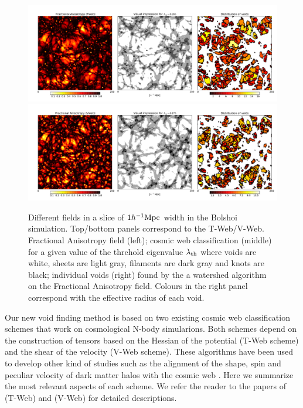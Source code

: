 \documentclass[a4,useAMS,usenatbib,usegraphicx]{mn2e}
\newcommand{\hMpc}{{\ifmmode{h^{-1}{\rm Mpc}}\else{$h^{-1}$Mpc}\fi}}
\begin{document}
\begin{figure}
  \includegraphics[trim = 16mm 8mm 5mm 12mm, clip, keepaspectratio=true,
  width=0.73\textheight]{cosmicweb_FA_Tweb.pdf}
  \includegraphics[trim = 16mm 8mm 5mm 12mm, clip, keepaspectratio=true,
  width=0.73\textheight]{cosmicweb_FA_Vweb.pdf}
  \caption{Different fields in a slice of
    $1\hMpc$ width in the Bolshoi simulation. Top/bottom panels correspond
    to the T-Web/V-Web.      
    Fractional Anisotropy field (left); cosmic web classification
    (middle) for a given value of the threhold eigenvalue
    $\lambda_{\rm th}$ where voids are white, sheets are light gray,
    filaments are dark gray and knots are black; individual voids (right) found by 
    the a watershed algorithm on the Fractional Anisotropy field. Colours
    in the right panel correspond with the effective radius of each void. }
  \label{fig:FA_field}
\end{figure}

Our new void finding method is based on two existing cosmic web
classification schemes that work on cosmological N-body simularions.
Both schemes depend on the construction of tensors based on the
Hessian of the potential (T-Web scheme) and the shear of the velocity
(V-Web scheme). 
These algorithms have been used to develop other
kind of studies such as the alignment of the shape, spin and peculiar
velocity of dark matter halos with the cosmic web
\citep{Libeskind13,Forero2014}. 
Here we summarize the most relevant aspects of each scheme. 
We refer the reader to the papers of \cite{Forero09} (T-Web) and
\cite{Hoffman12} (V-Web) for detailed descriptions.  
\end{document}
